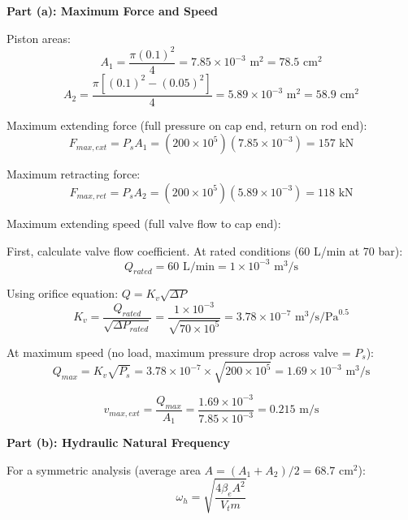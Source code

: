 \textbf{Part (a): Maximum Force and Speed}

Piston areas:
\begin{equation}
    A_1 = \frac{\pi (0.1)^2}{4} = 7.85 \times 10^{-3} \text{ m}^2 = 78.5 \text{ cm}^2
\end{equation}
\begin{equation}
    A_2 = \frac{\pi [(0.1)^2 - (0.05)^2]}{4} = 5.89 \times 10^{-3} \text{ m}^2 = 58.9 \text{ cm}^2
\end{equation}

Maximum extending force (full pressure on cap end, return on rod end):
\begin{equation}
    F_{max,ext} = P_s A_1 = (200 \times 10^5)(7.85 \times 10^{-3}) = 157 \text{ kN}
\end{equation}

Maximum retracting force:
\begin{equation}
    F_{max,ret} = P_s A_2 = (200 \times 10^5)(5.89 \times 10^{-3}) = 118 \text{ kN}
\end{equation}

Maximum extending speed (full valve flow to cap end):

First, calculate valve flow coefficient. At rated conditions (60 L/min at 70 bar):
\begin{equation}
    Q_{rated} = 60 \text{ L/min} = 1 \times 10^{-3} \text{ m}^3\text{/s}
\end{equation}

Using orifice equation: $Q = K_v \sqrt{\Delta P}$
\begin{equation}
    K_v = \frac{Q_{rated}}{\sqrt{\Delta P_{rated}}} = \frac{1 \times 10^{-3}}{\sqrt{70 \times 10^5}} = 3.78 \times 10^{-7} \text{ m}^3\text{/s/Pa}^{0.5}
\end{equation}

At maximum speed (no load, maximum pressure drop across valve = $P_s$):
\begin{equation}
    Q_{max} = K_v \sqrt{P_s} = 3.78 \times 10^{-7} \times \sqrt{200 \times 10^5} = 1.69 \times 10^{-3} \text{ m}^3\text{/s}
\end{equation}

\begin{equation}
    v_{max,ext} = \frac{Q_{max}}{A_1} = \frac{1.69 \times 10^{-3}}{7.85 \times 10^{-3}} = 0.215 \text{ m/s}
\end{equation}

\textbf{Part (b): Hydraulic Natural Frequency}

For a symmetric analysis (average area $A = (A_1 + A_2)/2 = 68.7$ cm$^2$):
\begin{equation}
    \omega_h = \sqrt{\frac{4 \beta_e A^2}{V_t m}}
\end{equation}


